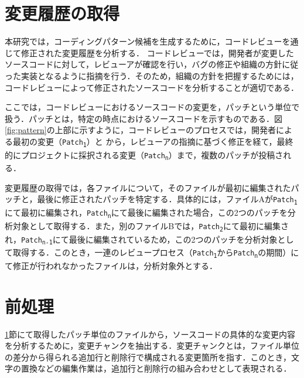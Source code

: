 \documentclass[11pt]{jreport}
\begin{document}
\section{変更履歴の取得}\label{sec:get_change}

本研究では，コーディングパターン候補を生成するために，コードレビューを通じて修正された変更履歴を分析する．
コードレビューでは，開発者が変更したソースコードに対して，レビューアが確認を行い，バグの修正や組織の方針に従った実装となるように指摘を行う．そのため，組織の方針を把握するためには，コードレビューによって修正されたソースコードを分析することが適切である．

ここでは，コードレビューにおけるソースコードの変更を，パッチという単位で扱う．パッチとは，特定の時点におけるソースコードを示すものである．図\ref{fig:pattern}の上部に示すように，コードレビューのプロセスでは，開発者による最初の変更（\texttt{Patch\textsubscript{1}}）と
から，レビューアの指摘に基づく修正を経て，最終的にプロジェクトに採択される変更（\texttt{Patch\textsubscript{n}}）まで，複数のパッチが投稿される．

変更履歴の取得では，各ファイルについて，そのファイルが最初に編集されたパッチと，最後に修正されたパッチを特定する．具体的には，ファイルAが\texttt{Patch\textsubscript{1}}にて最初に編集され，\texttt{Patch\textsubscript{n}}にて最後に編集された場合，この2つのパッチを分析対象として取得する．また，別のファイルBでは，\texttt{Patch\textsubscript{2}}にて最初に編集され，\texttt{Patch\textsubscript{n-1}}にて最後に編集されているため，この2つのパッチを分析対象として取得する．このとき，一連のレビュープロセス（\texttt{Patch\textsubscript{1}}から\texttt{Patch\textsubscript{n}}の期間）にて修正が行われなかったファイルは，分析対象外とする．

\section{前処理}\label{sec: pre_process}
\ref{sec:get_change}節にて取得したパッチ単位のファイルから，ソースコードの具体的な変更内容を分析するために，変更チャンクを抽出する．変更チャンクとは，ファイル単位の差分から得られる追加行と削除行で構成される変更箇所を指す．このとき，文字の置換などの編集作業は，追加行と削除行の組み合わせとして表現される．
\end{document}
